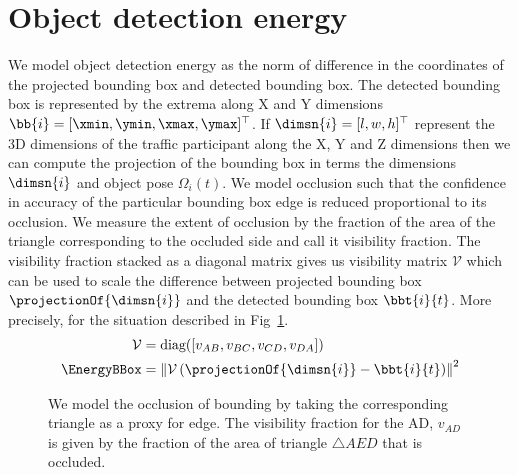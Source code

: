 \section{Object detection energy}

We model object detection energy as the norm of difference in the coordinates
of the projected bounding box and detected bounding box. The detected bounding
box is represented by the extrema along X and Y dimensions $\bb{i} = [\xmin,
\ymin, \xmax, \ymax]^\top$. If $\dimsn{i} = [l, w, h]^\top$ represent the 3D
dimensions of the traffic participant along the X, Y and Z dimensions then we 
can compute the projection of the bounding box in terms the dimensions $\dimsn{i}$
and object pose $\Omega_i(t)$. We model occlusion such that the confidence in
accuracy of the particular bounding box edge is reduced proportional to its
occlusion. We measure the extent of occlusion by the fraction of the area of 
the triangle corresponding to the occluded side and call it visibility fraction.
The visibility fraction stacked as a diagonal matrix gives us visibility matrix
$\mathcal{V}$ which can be used to scale the difference between projected bounding box
$\projectionOf{\dimsn{i}}$ and the detected bounding box $\bbt{i}{t}$. More precisely, for
the situation described in Fig~\ref{fig:bboxoccfigure}.
%
\begin{align}
  \mathcal{V} &= \text{diag}([v_{AB}, v_{BC}, v_{CD}, v_{DA}])\\
  \EnergyBBox &= \left\| \mathcal{V} \left(\projectionOf{\dimsn{i}}-\bbt{i}{t}\right) \right\|^2 
\end{align}
%
%
\begin{figure}
  \centering
  
  \caption{We model the occlusion of bounding by taking the corresponding
  triangle as a proxy for edge. The visibility fraction for the AD, $v_{AD}$ is given
by the fraction of the area of triangle $\bigtriangleup AED$ 
that is occluded.}
  \label{fig:bboxoccfigure}
\end{figure}

